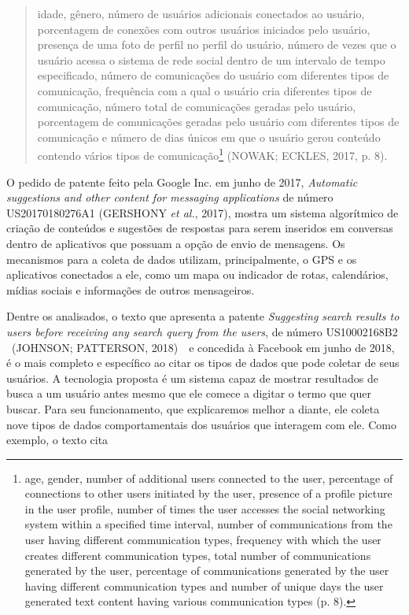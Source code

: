 \begin{quote}
idade, gênero, número de usuários adicionais conectados ao usuário,
porcentagem de conexões com outros usuários iniciados pelo usuário,
presença de uma foto de perfil no perfil do usuário, número de vezes que
o usuário acessa o sistema de rede social dentro de um intervalo de
tempo especificado, número de comunicações do usuário com diferentes
tipos de comunicação, frequência com a qual o usuário cria diferentes
tipos de comunicação, número total de comunicações geradas pelo usuário,
porcentagem de comunicações geradas pelo usuário com diferentes tipos de
comunicação e número de dias únicos em que o usuário gerou conteúdo
contendo vários tipos de comunicação\footnote{age, gender, number of
  additional users connected to the user, percentage of connections to
  other users initiated by the user, presence of a profile picture in
  the user profile, number of times the user accesses the social
  networking system within a specified time interval, number of
  communications from the user having different communication types,
  frequency with which the user creates different communication types,
  total number of communications generated by the user, percentage of
  communications generated by the user having different communication
  types and number of unique days the user generated text content having
  various communication types (p. 8).} (NOWAK; ECKLES, 2017, p. 8).
\end{quote}

O pedido de patente feito pela Google Inc. em junho de 2017,
\emph{Automatic suggestions and other content for messaging
applications} de número US20170180276A1 (GERSHONY \emph{et al.}, 2017),
mostra um sistema algorítmico de criação de conteúdos e sugestões de
respostas para serem inseridos em conversas dentro de aplicativos que
possuam a opção de envio de mensagens. Os mecanismos para a coleta de
dados utilizam, principalmente, o GPS e os aplicativos conectados a ele,
como um mapa ou indicador de rotas, calendários, mídias sociais e
informações de outros mensageiros.

Dentre os analisados, o texto que apresenta a patente \emph{Suggesting
search results to users before receiving any search query from the
users}, de número US10002168B2 ~(JOHNSON; PATTERSON, 2018)~~e concedida
à Facebook em junho de 2018, é o mais completo e específico ao citar os
tipos de dados que pode coletar de seus usuários. A tecnologia proposta
é um sistema capaz de mostrar resultados de busca a um usuário antes
mesmo que ele comece a digitar o termo que quer buscar. Para seu
funcionamento, que explicaremos melhor a diante, ele coleta nove tipos
de dados comportamentais dos usuários que interagem com ele. Como
exemplo, o texto cita

